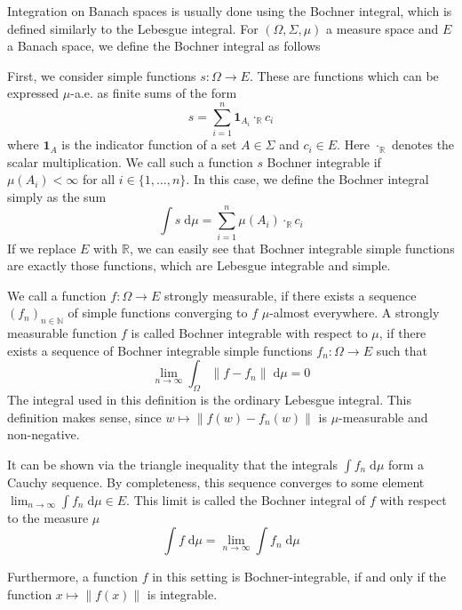 Integration on Banach spaces is usually done using the Bochner integral, which is defined similarly to the Lebesgue integral. For $(\Omega, \Sigma, \mu)$ a measure space and $E$ a Banach space, we define the Bochner integral as follows

\relax
{}\relax
\vspace{0.3cm}

First, we consider simple functions $s : \Omega \rightarrow E$. These are functions which can be expressed $\mu$-a.e. as finite sums of the form
\[
	s = \sum_{i=1}^n \mathbf{1}_{A_i} \cdot_\mathbb{R} c_i
\]
where $\mathbf{1}_A$ is the indicator function of a set $A \in \Sigma$ and $c_i \in E$. Here $\cdot_\mathbb{R}$ denotes the scalar multiplication. We call such a function $s$ Bochner integrable if $\mu(A_i) < \infty$ for all $i \in \{1,\dots,n\}$. In this case, we define the Bochner integral simply as the sum
\[
	\int s \; \textrm{d}\mu = \sum_{i=1}^n \mu(A_i) \cdot_\mathbb{R} c_i
\]
If we replace $E$ with $\mathbb{R}$, we can easily see that Bochner integrable simple functions are exactly those functions, which are Lebesgue integrable and simple.
\vspace{0.2cm}

We call a function $f : \Omega \rightarrow E$ strongly measurable, if there exists a sequence $(f_n)_{n\in\mathbb{N}}$ of simple functions converging to $f$ $\mu$-almost everywhere.
A strongly measurable function $f$ is called Bochner integrable with respect to $\mu$, if there exists a sequence of Bochner integrable simple functions $f_n : \Omega \rightarrow E$ such that
\[
	\lim_{n \to \infty} \int_\Omega \lVert f - f_n \rVert \; \textrm{d}\mu = 0
\]
The integral used in this definition is the ordinary Lebesgue integral. This definition makes sense, since $w \mapsto \lVert f(w) - f_n(w) \rVert$ is $\mu$-measurable and non-negative.

It can be shown via the triangle inequality that the integrals $\int f_n\; \textrm{d}\mu$ form a Cauchy sequence. By completeness, this sequence converges to some element $\lim_{n \to \infty} \int f_n \; \textrm{d}\mu \in E$. This limit is called the Bochner integral of $f$ with respect to the measure $\mu$
\[
	\int f \; \textrm{d}\mu = \lim_{n \to \infty} \int f_n \; \textrm{d}\mu
\]

Furthermore, a function $f$ in this setting is Bochner-integrable, if and only if the function $x \mapsto \lVert f(x) \rVert$ is integrable.

\vspace{0.3cm}
\relax
{}\relax

